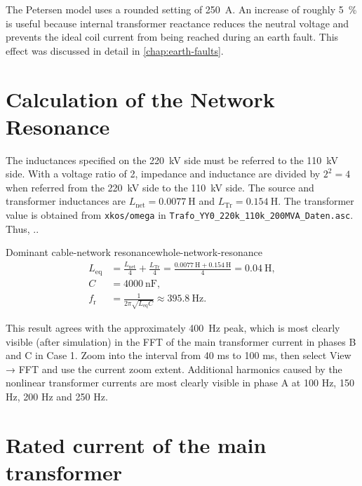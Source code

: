 The Petersen model uses a rounded setting of \SI{250}{\ampere}. An increase of roughly
\SI{5}{\percent} is useful because internal transformer reactance reduces the
neutral voltage and prevents the ideal coil current from being reached during
an earth fault. This effect was discussed in detail in
\cref{chap:earth-faults}.

\section{Calculation of the Network Resonance}
\label{sec:whole-network-resonance}

The inductances specified on the \SI{220}{\kilo\volt} side must be referred to
the \SI{110}{\kilo\volt} side. With a voltage ratio of 2, impedance and
inductance are divided by $2^2=4$ when referred from the
\SI{220}{\kilo\volt} side to the \SI{110}{\kilo\volt} side. 
The source and transformer inductances are $L_{\mathrm{net}}=\SI{0.0077}{\henry}$ and $L_{\mathrm{Tr}}=\SI{0.154}{\henry}$. The transformer value is obtained from
\texttt{xkos/omega} in \texttt{Trafo\_YY0\_220k\_110k\_200MVA\_Daten.asc}. Thus, ..



\begin{calculation}{Dominant cable-network resonance}{whole-network-resonance}
	\begin{align}
		L_{\mathrm{eq}}&=\frac{L_{\mathrm{net}}}{4}
		+\frac{L_{\mathrm{Tr}}}{4}
		=\frac{\SI{0.0077}{\henry}+\SI{0.154}{\henry}}{4}
		=\SI{0.04}{\henry},\\
		C&=\SI{4000}{\nano\farad},\\
		f_{\mathrm r}&=\frac{1}{2\pi\sqrt{L_{\mathrm{eq}}C}}
		\approx\boxed{\SI{395.8}{\hertz}}.
	\end{align}
\end{calculation}

This result agrees with the approximately \SI{400}{\hertz} peak, which is most clearly visible (after simulation) in
the FFT of the main transformer current in phases B and C in Case 1. Zoom into the interval from 40 ms to 100 ms, then select View → FFT and use the current zoom extent.
Additional harmonics caused by the nonlinear transformer currents are most clearly visible in phase A at 100 Hz, 150 Hz, 200 Hz and 250 Hz.

\section{Rated current of the main transformer}
\label{sec:whole-network-case1-values}

